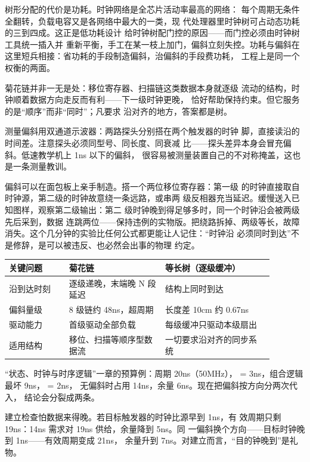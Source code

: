 树形分配的代价是功耗。时钟网络是全芯片活动率最高的网络：
每个周期无条件全翻转，负载电容又是各网络中最大的一类，现
代处理器里时钟树可占动态功耗的三到四成。这正是低功耗设计
给时钟树配门控的原因——而门控必须由时钟树工具统一插入并
重新平衡，手工在某一枝上加门，偏斜立刻失控。功耗与偏斜在
这里短兵相接：省功耗的手段制造偏斜，治偏斜的手段费功耗，
工程上是同一个权衡的两面。

菊花链并非一无是处：移位寄存器、扫描链这类数据本身就逐级
流动的结构，时钟顺着数据方向走反而有利——下一级时钟更晚，
恰好帮助保持约束。但它服务的是“顺序”而非“同时”；凡要求
沿对齐的地方，答案都是树。

测量偏斜用双通道示波器：两路探头分别搭在两个触发器的时钟
脚，直接读沿的时间差。注意探头必须同型号、同长度、同衰减
比——探头差异本身会冒充偏斜。低速教学机上 1ns 以下的偏斜，
很容易被测量装置自己的不对称掩盖，这也是一条测量教训。

偏斜可以在面包板上亲手制造。搭一个两位移位寄存器：第一级
的时钟直接取自时钟源，第二级的时钟故意绕一条远路，或串两
级反相器充当延迟。缓慢送入已知图样，观察第二级输出：第二
级时钟晚到得足够多时，同一个时钟沿会被两级先后采到，数据
连跳两位——保持违例的实物版。把绕路拆掉、两级等长，故障
消失。这个几分钟的实验比任何公式都更能让人记住：“时钟沿
必须同时到达”不是修辞，是可以被违反、也必然会出事的物理
约定。

\begin{longtable}{L{0.2\linewidth}L{0.32\linewidth}L{0.36\linewidth}}
\toprule
关键问题 & 菊花链 & 等长树（逐级缓冲） \\
\midrule
沿到达时刻 & 逐级递晚，末端晚 N 段延迟 & 结构上同时到达 \\\tablerowrule
偏斜量级 & 8 级链约 48ns，超周期 & 长度差 10cm 约 0.67ns \\\tablerowrule
驱动能力 & 首级驱动全部负载 & 每级缓冲只驱动本级扇出 \\\tablerowrule
适用结构 & 移位、扫描等顺序型数据流 & 一切要求沿对齐的同步系统 \\
\bottomrule
\end{longtable}

“状态、时钟与时序逻辑”一章的预算例：周期 20ns（50MHz），
 = 3ns，组合逻辑最坏 9ns， = 2ns，
无偏斜时占用 14ns，余量 6ns。现在把偏斜按方向分两次代入，
结论会分裂成两条。

建立检查怕数据来得晚。若目标触发器的时钟比源早到 1ns，有
效周期只剩 19ns：14ns 需求对 19ns 供给，余量降到 5ns。同
一偏斜换个方向——目标时钟晚到 1ns——有效周期变成 21ns，
余量升到 7ns。对建立而言，“目的钟晚到”是礼物。

